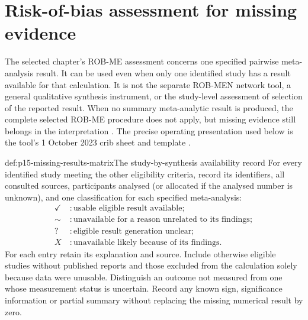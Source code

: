 \section{Risk-of-bias assessment for missing evidence}
\label{sec:p15-missing-robme}

The selected chapter's ROB-ME assessment concerns one specified
pairwise meta-analysis result. It can be used even when only one
identified study has a result available for that calculation.
It is not the separate ROB-MEN network tool, a general qualitative
synthesis instrument, or the study-level assessment of selection of
the reported result. When no summary meta-analytic result is produced,
the complete selected ROB-ME procedure does not apply, but missing
evidence still belongs in the interpretation
\cite[sec.~13.3]{PageHigginsSterne2024Cochrane13}.
The precise operating presentation used below is the tool's
1 October 2023 crib sheet and template \cite{ROBME2023Cribsheet}.

\begin{hbdefinition}{def:p15-missing-results-matrix}{The study-by-synthesis availability record}
For every identified study meeting the other eligibility criteria,
record its identifiers, all consulted sources, participants analysed
(or allocated if the analysed number is unknown), and one classification
for each specified meta-analysis:
\[
 \begin{aligned}
 \checkmark\ &:\text{usable eligible result available};\\
 \sim\ &:\text{unavailable for a reason unrelated to its findings};\\
 ?\ &:\text{eligible result generation unclear};\\
 X\ &:\text{unavailable likely because of its findings}.
 \end{aligned}
\]
For each entry retain its explanation and source. Include otherwise
eligible studies without published reports and those excluded from
the calculation solely because data were unusable. Distinguish an
outcome not measured from one whose measurement status is uncertain.
Record any known sign, significance information or partial summary
without replacing the missing numerical result by zero.
\end{hbdefinition}

